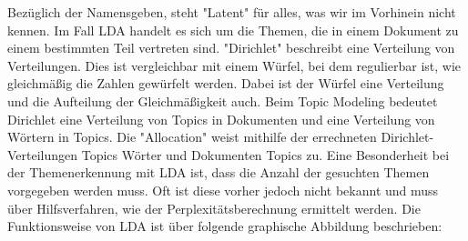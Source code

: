 \documentclass[german,version-2020-11]{uzl-thesis}
\begin{document}
Bezüglich der Namensgeben, steht "Latent" für alles, was wir im Vorhinein nicht kennen. Im Fall LDA handelt es sich um die Themen, die in einem Dokument zu einem bestimmten Teil vertreten sind. "Dirichlet" beschreibt eine Verteilung von Verteilungen. Dies ist vergleichbar mit einem Würfel, bei dem regulierbar ist, wie gleichmäßig die Zahlen gewürfelt werden. Dabei ist der Würfel eine Verteilung und die Aufteilung der Gleichmäßigkeit auch. Beim Topic Modeling bedeutet Dirichlet eine Verteilung von Topics in Dokumenten und eine Verteilung von Wörtern in Topics. Die "Allocation" weist  mithilfe der errechneten Dirichlet-Verteilungen Topics Wörter und Dokumenten Topics zu. Eine Besonderheit bei der Themenerkennung mit LDA ist, dass die Anzahl der gesuchten Themen  vorgegeben werden muss. Oft ist diese vorher jedoch nicht bekannt und muss über Hilfsverfahren, wie der Perplexitätsberechnung ermittelt werden. Die Funktionsweise von LDA ist über folgende graphische Abbildung beschrieben: \\

\begin{center}
\end{center}\\
\end{document}
